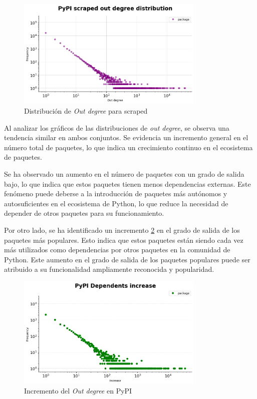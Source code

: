 \begin{figure}[h!]
    \begin{center}
        \includegraphics[width=0.8\textwidth]{img/pypi/outd_scraped_dist.png}
        \caption{Distribución de \textit{Out degree} para scraped}
        \label{fig:pypi_scraped_outd_dist}
    \end{center}
\end{figure}

Al analizar los gráficos de las distribuciones de \textit{out degree}, se observa una tendencia similar
en ambos conjuntos. Se evidencia un incremento general en el número total de paquetes, lo que indica un
crecimiento continuo en el ecosistema de paquetes.

Se ha observado un aumento en el número de paquetes con un grado de salida bajo, lo que indica que estos
paquetes tienen menos dependencias externas. Este fenómeno puede deberse a la introducción de paquetes
más autónomos y autosuficientes en el ecosistema de Python, lo que reduce la necesidad de depender de
otros paquetes para su funcionamiento.

Por otro lado, se ha identificado un incremento \ref{fig:dependents_increase} en el grado de salida de los paquetes más populares.
Esto indica que estos paquetes están siendo cada vez más utilizados como dependencias por otros paquetes
en la comunidad de Python. Este aumento en el grado de salida de los paquetes populares puede ser atribuido
a su funcionalidad ampliamente reconocida y popularidad.

\begin{figure}[h!]
    \begin{center}
        \includegraphics[width=0.8\textwidth]{img/pypi/dependents_increase.png}
        \caption{Incremento del \textit{Out degree} en PyPI}
        \label{fig:dependents_increase}
    \end{center}
\end{figure}


